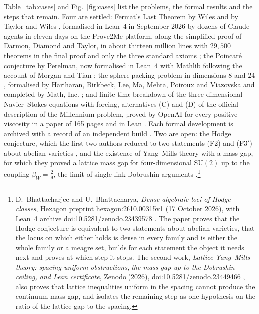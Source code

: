 Table~\ref{tab:cases} and Fig.~\ref{fig:cases} list the problems, the formal results and the steps that remain. Four are settled: Fermat's Last Theorem by Wiles and by Taylor and Wiles \cite{Wil95,TW95}, formalised in Lean~4 in September 2026 by dozens of Claude agents in eleven days on the Prove2Me platform, along the simplified proof of Darmon, Diamond and Taylor, in about thirteen million lines with $29{,}500$ theorems in the final proof and only the three standard axioms \cite{Ant26,CML26,DDT95}; the Poincar\'e conjecture by Perelman, now formalised in Lean~4 with Mathlib following the account of Morgan and Tian \cite{ZDC26}; the sphere packing problem in dimensions $8$ and $24$ \cite{Via17,CKM17}, formalised by Hariharan, Birkbeck, Lee, Ma, Mehta, Poiroux and Viazovska and completed by Math, Inc. \cite{HBL26}; and finite-time breakdown of the three-dimensional Navier--Stokes equations with forcing, alternatives (C) and (D) of the official description of the Millennium problem, proved by OpenAI for every positive viscosity in a paper of 165 pages and in Lean \cite{OAI26}. Each formal development is archived with a record of an independent build \cite{ArcNS,ArcPC,ArcSP}. Two are open: the Hodge conjecture, which the first two authors reduced to two statements (F2) and (F3$'$) about abelian varieties \cite{BB26c}, and the existence of Yang--Mills theory with a mass gap, for which they proved a lattice mass gap for four-dimensional $\mathrm{SU}(2)$ up to the coupling $\beta_{W}=\frac29$, the limit of single-link Dobrushin arguments \cite{BB26d}.\footnote{D.~Bhattacharjee and U.~Bhattacharya, \emph{Dense algebraic loci of Hodge classes}, Hexagon preprint hexagon:2610.00315v1 (17 October 2026), with Lean~4 archive doi:10.5281/zenodo.23439578 \cite{BB26c}. The paper proves that the Hodge conjecture is equivalent to two statements about abelian varieties, that the locus on which either holds is dense in every family and is either the whole family or a meagre set, builds for each statement the object it needs next and proves at which step it stops. The second work, \emph{Lattice Yang--Mills theory: spacing-uniform obstructions, the mass gap up to the Dobrushin ceiling, and Lean certificate}, Zenodo (2026), doi:10.5281/zenodo.23449466 \cite{BB26d}, also proves that lattice inequalities uniform in the spacing cannot produce the continuum mass gap, and isolates the remaining step as one hypothesis on the ratio of the lattice gap to the spacing.}

